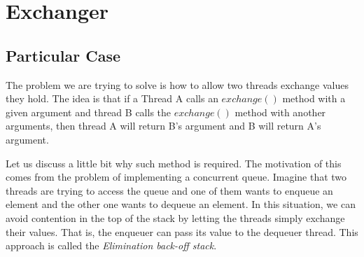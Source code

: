 \section{\textbf{Exchanger}}
\subsection{Particular Case}
\par
The problem we are trying to solve is how to allow two threads exchange values
they hold. The idea is that if a Thread A calls an $exchange()$ method with a given
argument and thread B calls the $exchange()$ method with another arguments, then
thread A will return B's argument and B will return A's argument.
\par
Let us discuss a little bit why such method is required. The motivation of this
comes from the problem of implementing a concurrent queue. Imagine that two
threads are trying to access the queue and one of them wants to enqueue an
element and the other one wants to dequeue an element. In this situation, we can
avoid contention in the top of the stack by letting the threads simply exchange
their values. That is, the enqueuer can pass its value to the dequeuer thread.
This approach is called the \textit{Elimination back-off stack}.
\par
